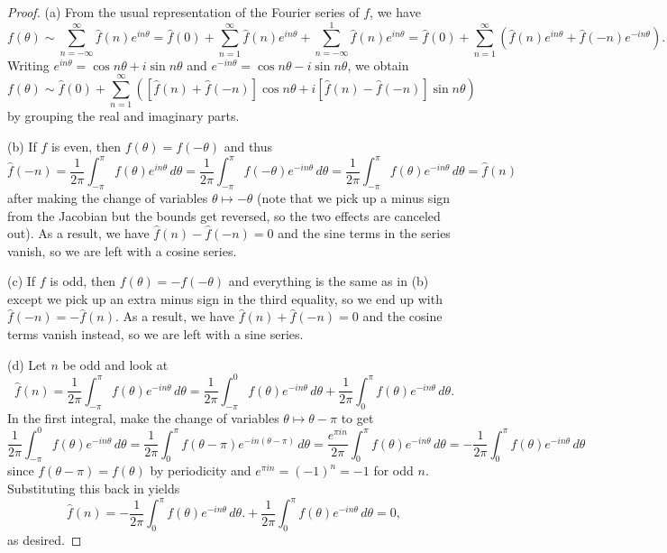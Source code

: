 \documentclass[letterpaper, 12pt]{article}
\begin{document}
\begin{proof}
  (a) From the usual representation of the Fourier
  series of $f$, we have
  \[
    f(\theta) \sim \sum_{n = -\infty}^\infty \hat{f}(n) e^{in\theta}
    = \hat{f}(0) + \sum_{n = 1}^{\infty} \hat{f}(n) e^{in\theta} + \sum_{n = -\infty}^{1} \hat{f}(n) e^{in\theta}
    = \hat{f}(0) + \sum_{n = 1}^{\infty} \left(\hat{f}(n) e^{in\theta} + \hat{f}(-n) e^{-in\theta}\right).
  \]
  Writing $e^{in\theta} = \cos n\theta + i \sin n\theta$
  and $e^{-in\theta} = \cos n\theta - i \sin n\theta$,
  we obtain
  \[
    f(\theta) \sim \hat{f}(0)
    + \sum_{n = 1}^{\infty} \left([\hat{f}(n) + \hat{f}(-n)] \cos n\theta + i [\hat{f}(n) - \hat{f}(-n)] \sin n\theta\right)
  \]
  by grouping the real and imaginary parts.

  (b) If $f$ is even, then $f(\theta) = f(-\theta)$ and
  thus
  \[
    \hat{f}(-n) = \frac{1}{2\pi} \int_{-\pi}^{\pi} f(\theta) e^{in\theta}\, d\theta
    = \frac{1}{2\pi} \int_{-\pi}^{\pi} f(-\theta) e^{-in\theta}\, d\theta
    = \frac{1}{2\pi} \int_{-\pi}^{\pi} f(\theta) e^{-in\theta}\, d\theta
    = \hat{f}(n)
  \]
  after making the change of variables
  $\theta \mapsto -\theta$ (note that we pick up a minus
  sign from the Jacobian but the bounds get reversed,
  so the two effects are canceled out). As a result,
  we have $\hat{f}(n) - \hat{f}(-n) = 0$ and the
  sine terms in the series vanish, so we are
  left with a cosine series.

  (c) If $f$ is odd, then $f(\theta) = -f(-\theta)$ and
  everything is the same as in (b) except we pick up
  an extra minus sign in the third equality, so
  we end up with $\hat{f}(-n) = -\hat{f}(n)$. As a result,
  we have $\hat{f}(n) + \hat{f}(-n) = 0$ and the
  cosine terms vanish instead, so we are
  left with a sine series.

  (d) Let $n$ be odd and look at
  \[
    \hat{f}(n)
    = \frac{1}{2\pi} \int_{-\pi}^{\pi} f(\theta) e^{-in\theta}\, d\theta
    = \frac{1}{2\pi} \int_{-\pi}^{0} f(\theta) e^{-in\theta}\, d\theta
    + \frac{1}{2\pi} \int_{0}^{\pi} f(\theta) e^{-in\theta}\, d\theta.
  \]
  In the first integral, make the change of
  variables $\theta \mapsto \theta - \pi$ to get
  \[
    \frac{1}{2\pi} \int_{-\pi}^{0} f(\theta) e^{-in\theta}\, d\theta
    = \frac{1}{2\pi} \int_{0}^{\pi} f(\theta - \pi) e^{-in(\theta - \pi)}\, d\theta
    = \frac{e^{\pi i n}}{2\pi} \int_{0}^{\pi} f(\theta) e^{-in\theta}\, d\theta
    = -\frac{1}{2\pi} \int_{0}^{\pi} f(\theta) e^{-in\theta}\, d\theta
  \]
  since $f(\theta - \pi) = f(\theta)$ by periodicity
  and $e^{\pi i n} = (-1)^n = -1$ for odd $n$.
  Substituting this back in yields
  \[
    \hat{f}(n)
    = -\frac{1}{2\pi} \int_{0}^{\pi} f(\theta) e^{-in\theta}\, d\theta.
    + \frac{1}{2\pi} \int_{0}^{\pi} f(\theta) e^{-in\theta}\, d\theta = 0,
  \]
  as desired.


\end{proof}
\end{document}
